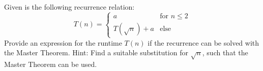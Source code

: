  \\
Given is the following recurrence relation:
\begin{equation}
T(n) = \left\lbrace\begin{array}{ll}
a & \mbox{for } n\leq 2\\
T(\sqrt{n}) + a & \mbox{else}
\end{array}
\right.
\end{equation}
Provide an expression for the runtime  $T(n)$ if the recurrence can be solved 
with the Master Theorem.
Hint: Find a suitable substitution for $\sqrt{n}$, such that the Master Theorem 
can be used.